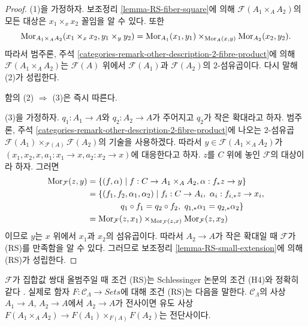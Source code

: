 \begin{proof}
(1)을 가정하자. 보조정리 \ref{lemma-RS-fiber-square}에 의해
$\mathcal{F}(A_1 \times_A A_2)$의 모든 대상은
$x_1 \times_x x_2$ 꼴임을 알 수 있다. 또한
$$
\mathop{\mathrm{Mor}}\nolimits_{A_1 \times_A A_2}(x_1 \times_x x_2, y_1 \times_y y_2) =
\mathop{\mathrm{Mor}}\nolimits_{A_1}(x_1, y_1) \times_{\mathop{\mathrm{Mor}}\nolimits_A(x, y)}
\mathop{\mathrm{Mor}}\nolimits_{A_2}(x_2, y_2).
$$
따라서 범주론, 주석
\ref{categories-remark-other-description-2-fibre-product}에 의해
$\mathcal{F}(A_1 \times_A A_2)$는 $\mathcal{F}(A)$ 위에서
$\mathcal{F}(A_1)$과 $\mathcal{F}(A_2)$의 $2$-섬유곱이다.
다시 말해 (2)가 성립한다.

\medskip\noindent
함의 (2) $\Rightarrow$ (3)은 즉시 따른다.

\medskip\noindent
(3)을 가정하자.
$q_1 : A_1 \to A$와 $q_2 : A_2 \to A$가 주어지고
$q_2$가 작은 확대라고 하자.
범주론, 주석 \ref{categories-remark-other-description-2-fibre-product}에
나오는 $2$-섬유곱
$\mathcal{F}(A_1) \times_{\mathcal{F}(A)} \mathcal{F}(A_2)$의 기술을
사용하겠다. 따라서 $y \in \mathcal{F}(A_1 \times_A A_2)$가
$(x_1, x_2, x, a_1 : x_1 \to x, a_2 : x_2 \to x)$에 대응한다고 하자.
$z$를 $C$ 위에 놓인 $\mathcal{F}$의 대상이라 하자. 그러면
\begin{align*}
\Mor_\mathcal{F}(z, y) & =
\{(f, \alpha) \mid f : C \to A_1 \times_A A_2,
\alpha : f_*z \to y\} \\
& = \{(f_1, f_2, \alpha_1, \alpha_2) \mid
f_i : C \to A_i, \ \alpha_i : f_{i, *}z \to x_i, \\
& \quad\quad\quad\quad
q_1 \circ f_1 = q_2 \circ f_2, \ q_{1, *} \alpha_1 = q_{2, *}\alpha_2\} \\ %
& =
\Mor_\mathcal{F}(z, x_1) \times_{\Mor_\mathcal{F}(z, x)}
\Mor_\mathcal{F}(z, x_2)
\end{align*}
이므로 $y$는 $x$ 위에서 $x_1$과 $x_2$의 섬유곱이다.
따라서 $A_2 \to A$가 작은 확대일 때
$\mathcal{F}$가 (RS)를 만족함을 알 수 있다.
그러므로 보조정리 \ref{lemma-RS-small-extension}에 의해 (RS)가 성립한다.
\end{proof}

\begin{remark}
\label{remark-compare-schlessinger-H4}
$\mathcal{F}$가 집합값 쌍대 올범주일 때 조건 (RS)는
Schlessinger 논문의 조건 (H4)와 정확히 같다
\cite[Theorem 2.11]{Sch}. 실제로 함자
$F: \mathcal{C}_\Lambda \to \textit{Sets}$에 대해 조건 (RS)는 다음을
말한다. $\mathcal{C}_\Lambda$의 사상 $A_1 \to A$, $A_2 \to A$에서
$A_2 \to A$가 전사이면 유도 사상
$F(A_1 \times_A A_2) \to F(A_1) \times_{F(A)} F(A_2)$는 전단사이다.
\end{remark}

